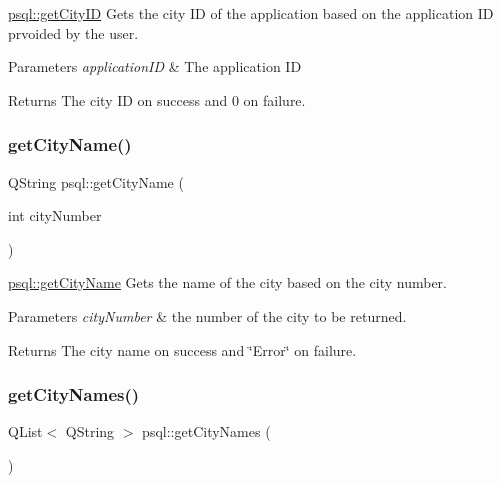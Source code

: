\hyperlink{classpsql_af3462a12dc106e0ca8df4fa8fcf28436}{psql\+::get\+City\+ID} Gets the city ID of the application based on the application ID prvoided by the user. 


\begin{DoxyParams}{Parameters}
{\em application\+ID} & The application ID \\
\hline
\end{DoxyParams}
\begin{DoxyReturn}{Returns}
The city ID on success and 0 on failure. 
\end{DoxyReturn}
\mbox{\label{classpsql_a7acc18034ef60c8a1e69b0e1a15d8ab2}} 
\subsubsection{\texorpdfstring{get\+City\+Name()}{getCityName()}}
{\footnotesize\ttfamily Q\+String psql\+::get\+City\+Name (\begin{DoxyParamCaption}\item[{int}]{city\+Number }\end{DoxyParamCaption})}



\hyperlink{classpsql_a7acc18034ef60c8a1e69b0e1a15d8ab2}{psql\+::get\+City\+Name} Gets the name of the city based on the city number. 


\begin{DoxyParams}{Parameters}
{\em city\+Number} & the number of the city to be returned. \\
\hline
\end{DoxyParams}
\begin{DoxyReturn}{Returns}
The city name on success and \char`\"{}\+Error\char`\"{} on failure. 
\end{DoxyReturn}
\mbox{\label{classpsql_a42ee0cf90055ba6a7a6f564cf04d8bb8}} 
\subsubsection{\texorpdfstring{get\+City\+Names()}{getCityNames()}}
{\footnotesize\ttfamily Q\+List$<$ Q\+String $>$ psql\+::get\+City\+Names (\begin{DoxyParamCaption}{ }\end{DoxyParamCaption})}



